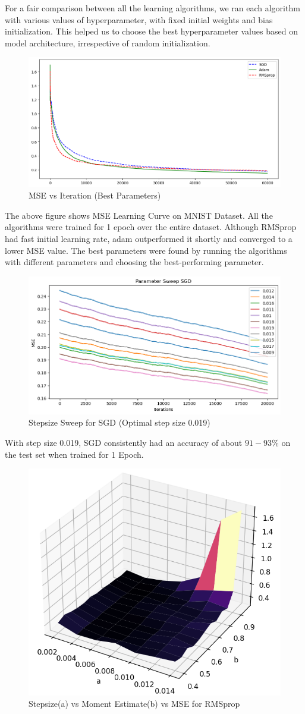 \documentclass{article}
\begin{document}
For a fair comparison between all the learning algorithms, we ran each algorithm with various values of hyperparameter, with fixed initial weights and bias initialization. This helped us to choose the best hyperparameter values based on model architecture, irrespective of random initialization.
\begin{figure}[H]
    \centering
    \includegraphics[width=0.7\linewidth]{Images/MSE Learning Curve.png}
    \caption{MSE vs Iteration (Best Parameters)}
\end{figure}
The above figure shows MSE Learning Curve on MNIST Dataset. All the algorithms were trained for 1 epoch over the entire dataset. Although RMSprop had fast initial learning rate, adam outperformed it shortly and converged to a lower MSE value.
The best parameters were found by running the algorithms with different parameters and choosing the best-performing parameter.
\begin{figure}[H]
    \centering
    \includegraphics[width=0.7\linewidth]{Images/SGD_sweep.png}
    \caption{Stepsize Sweep for SGD (Optimal step size 0.019)}
\end{figure}
With step size 0.019, SGD consistently had an accuracy of about $91-93\%$ on the test set when trained for 1 Epoch.
\begin{figure}[H]
    \centering
    \includegraphics[width=0.7\linewidth]{Images/a_b_MSE_RMSprop.png}
    \caption{Stepsize(a) vs Moment Estimate(b) vs MSE for RMSprop}
\end{figure}
\end{document}
